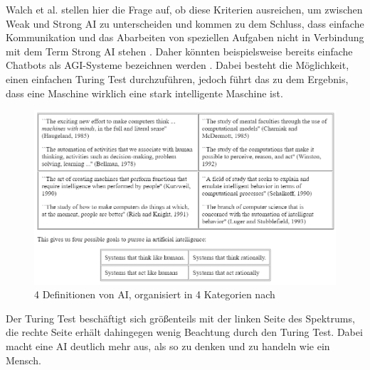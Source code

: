             Walch et al. stellen hier die Frage auf, ob diese Kriterien ausreichen, um zwischen Weak und Strong AI
            zu unterscheiden und kommen zu dem Schluss, dass einfache Kommunikation und das Abarbeiten von
            speziellen Aufgaben nicht in Verbindung mit dem Term Strong AI stehen \citeyearpar{walch_world_2019}.
            Daher könnten beispielsweise bereits einfache Chatbots als AGI-Systeme bezeichnen werden \cite{walch_world_2019}.
            Dabei besteht die Möglichkeit, einen einfachen Turing Test durchzuführen, jedoch führt das zu dem Ergebnis,
            dass eine Maschine wirklich eine stark intelligente Maschine ist.
            \begin{figure}[h]
                \begin{center}
                    \includegraphics[width=1.0\textwidth]{figures/ai-definitions.png}
                    \caption[4 Definitionen AI]{4 Definitionen von AI, organisiert in 4 Kategorien nach \cite{russell}}
                    \label{pic:ai-definitions}
                \end{center}
            \end{figure}
            Der Turing Test beschäftigt sich größenteils mit der linken Seite des Spektrums, die rechte Seite erhält
            dahingegen wenig Beachtung durch den Turing Test. Dabei macht eine AI deutlich mehr aus, als so zu denken
            und zu handeln wie ein Mensch.



